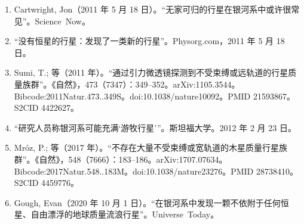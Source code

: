 \begin{enumerate}
\item Cartwright, Jon（2011 年 5 月 18 日）。“无家可归的行星在银河系中或许很常见”。Science~Now。  
\item “没有恒星的行星：发现了一类新的行星”。Physorg.com，2011 年 5 月 18 日。  
\item Sumi, T.; 等（2011 年）。“通过引力微透镜探测到不受束缚或远轨道的行星质量族群”。《自然》，473（7347）：349--352。arXiv:1105.3544。Bibcode:2011Natur.473..349S。doi:10.1038/nature10092。PMID 21593867。S2CID 4422627。  
\item “研究人员称银河系可能充满‘游牧行星’”。斯坦福大学。2012 年 2 月 23 日。  
\item Mróz, P.; 等（2017 年）。“不存在大量不受束缚或宽轨道的木星质量行星族群”。《自然》，548（7666）：183--186。arXiv:1707.07634。Bibcode:2017Natur.548..183M。doi:10.1038/nature23276。PMID 28738410。S2CID 4459776。  
\item Gough, Evan（2020 年 10 月 1 日）。“在银河系中发现一颗不依附于任何恒星、自由漂浮的地球质量流浪行星”。Universe~Today。






\end{enumerate}